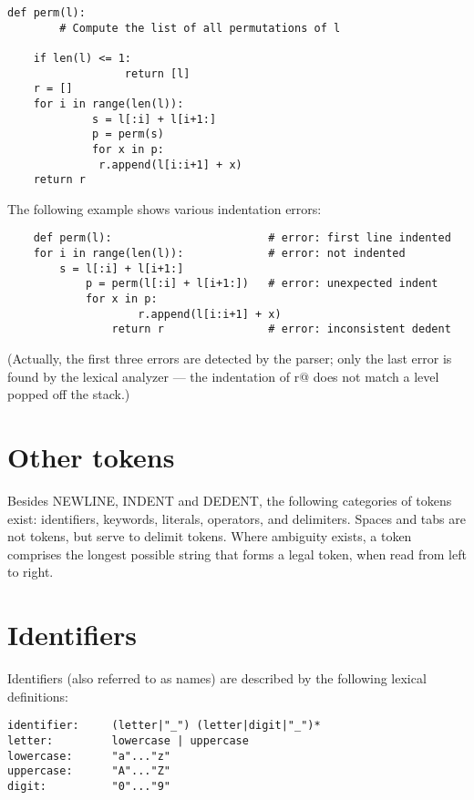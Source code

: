 \begin{verbatim}
def perm(l):
        # Compute the list of all permutations of l

    if len(l) <= 1:
                  return [l]
    r = []
    for i in range(len(l)):
             s = l[:i] + l[i+1:]
             p = perm(s)
             for x in p:
              r.append(l[i:i+1] + x)
    return r
\end{verbatim}

The following example shows various indentation errors:

\begin{verbatim}
    def perm(l):                        # error: first line indented
    for i in range(len(l)):             # error: not indented
        s = l[:i] + l[i+1:]
            p = perm(l[:i] + l[i+1:])   # error: unexpected indent
            for x in p:
                    r.append(l[i:i+1] + x)
                return r                # error: inconsistent dedent
\end{verbatim}

(Actually, the first three errors are detected by the parser; only the
last error is found by the lexical analyzer --- the indentation of
\verb@return r@ does not match a level popped off the stack.)

\section{Other tokens}

Besides NEWLINE, INDENT and DEDENT, the following categories of tokens
exist: identifiers, keywords, literals, operators, and delimiters.
Spaces and tabs are not tokens, but serve to delimit tokens.  Where
ambiguity exists, a token comprises the longest possible string that
forms a legal token, when read from left to right.

\section{Identifiers}

Identifiers (also referred to as names) are described by the following
lexical definitions:

\begin{verbatim}
identifier:     (letter|"_") (letter|digit|"_")*
letter:         lowercase | uppercase
lowercase:      "a"..."z"
uppercase:      "A"..."Z"
digit:          "0"..."9"
\end{verbatim}

